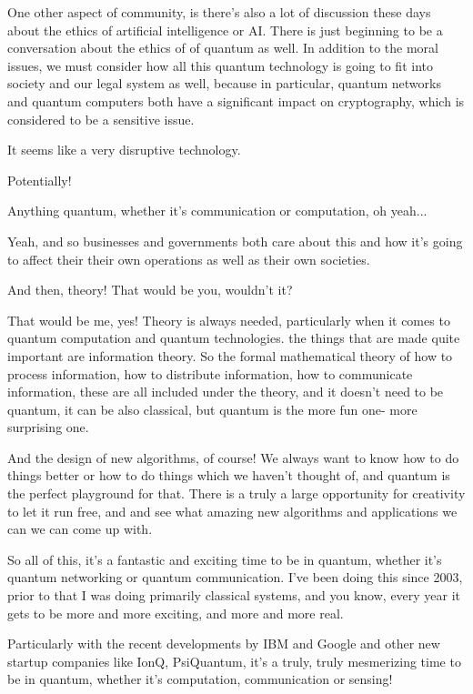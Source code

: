 One other aspect of community, is there's also a lot of discussion these days about the ethics of artificial intelligence or AI. There is just beginning to be a conversation about the ethics of of quantum as well. In addition to the moral issues, we must consider how all this quantum technology is going to fit into society and our legal system as well, because in particular, quantum networks and quantum computers both have a significant impact on cryptography, which is considered to be a sensitive issue.

\mmm It seems like a very disruptive technology. 

\rrr Potentially!

\mmm Anything quantum, whether it's communication or computation, oh yeah...

\rrr Yeah, and so businesses and governments both care about this and how it's going to affect their their own operations as well as their own societies.

And then, theory! That would be you, wouldn't it?

\mmm That would be me, yes! Theory is always needed, particularly when it comes to quantum computation and quantum technologies. the things that are made quite important are information theory. So the formal mathematical theory of how to process information, how to distribute information, how to communicate information, these are all included under the theory, and it doesn't need to be quantum, it can be also classical, but quantum is the more fun one- more surprising one.

And the design of new algorithms, of course! We always want to know how to do things better or how to do things which we haven't thought of, and quantum is the perfect playground for that. There is a truly a large opportunity for creativity to let it run free, and and see what amazing new algorithms and applications we can we can come up with.

\rrr So all of this, it's a fantastic and exciting time to be in quantum, whether it's quantum networking or quantum communication. I've been doing this since 2003, prior to that I was doing primarily classical systems, and you know, every year it gets to be more and more exciting, and more and more real.

\mmm Particularly with the recent developments by IBM and Google and other new startup companies like IonQ, PsiQuantum, it's a truly, truly mesmerizing time to be in quantum, whether it's computation, communication or sensing!

